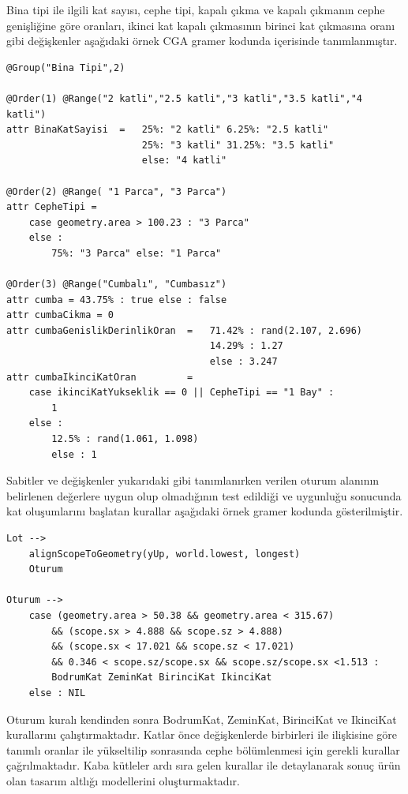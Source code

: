 \documentclass[12pt,turkish,a4paperpaper,]{report}
\begin{document}
Bina tipi ile ilgili kat sayısı, cephe tipi, kapalı çıkma ve kapalı
çıkmanın cephe genişliğine göre oranları, ikinci kat kapalı çıkmasının
birinci kat çıkmasına oranı gibi değişkenler aşağıdaki örnek CGA gramer
kodunda içerisinde tanımlanmıştır.

\begin{verbatim}
@Group("Bina Tipi",2)

@Order(1) @Range("2 katli","2.5 katli","3 katli","3.5 katli","4 katli")
attr BinaKatSayisi  =   25%: "2 katli" 6.25%: "2.5 katli"
                        25%: "3 katli" 31.25%: "3.5 katli"
                        else: "4 katli"

@Order(2) @Range( "1 Parca", "3 Parca")
attr CepheTipi =
    case geometry.area > 100.23 : "3 Parca"
    else :
        75%: "3 Parca" else: "1 Parca"
        
@Order(3) @Range("Cumbalı", "Cumbasız")
attr cumba = 43.75% : true else : false
attr cumbaCikma = 0
attr cumbaGenislikDerinlikOran  =   71.42% : rand(2.107, 2.696)
                                    14.29% : 1.27  
                                    else : 3.247
attr cumbaIkinciKatOran         =
    case ikinciKatYukseklik == 0 || CepheTipi == "1 Bay" :
        1
    else :
        12.5% : rand(1.061, 1.098)
        else : 1
\end{verbatim}

Sabitler ve değişkenler yukarıdaki gibi tanımlanırken verilen oturum
alanının belirlenen değerlere uygun olup olmadığının test edildiği ve
uygunluğu sonucunda kat oluşumlarını başlatan kurallar aşağıdaki örnek
gramer kodunda gösterilmiştir.

\newpage

\begin{verbatim}
Lot -->
    alignScopeToGeometry(yUp, world.lowest, longest)
    Oturum

Oturum -->
    case (geometry.area > 50.38 && geometry.area < 315.67)
        && (scope.sx > 4.888 && scope.sz > 4.888)
        && (scope.sx < 17.021 && scope.sz < 17.021)
        && 0.346 < scope.sz/scope.sx && scope.sz/scope.sx <1.513 :
        BodrumKat ZeminKat BirinciKat IkinciKat
    else : NIL
\end{verbatim}

Oturum kuralı kendinden sonra BodrumKat, ZeminKat, BirinciKat ve
IkinciKat kurallarını çalıştırmaktadır. Katlar önce değişkenlerde
birbirleri ile ilişkisine göre tanımlı oranlar ile yükseltilip
sonrasında cephe bölümlenmesi için gerekli kurallar çağrılmaktadır. Kaba
kütleler ardı sıra gelen kurallar ile detaylanarak sonuç ürün olan
tasarım altlığı modellerini oluşturmaktadır.
\end{document}
